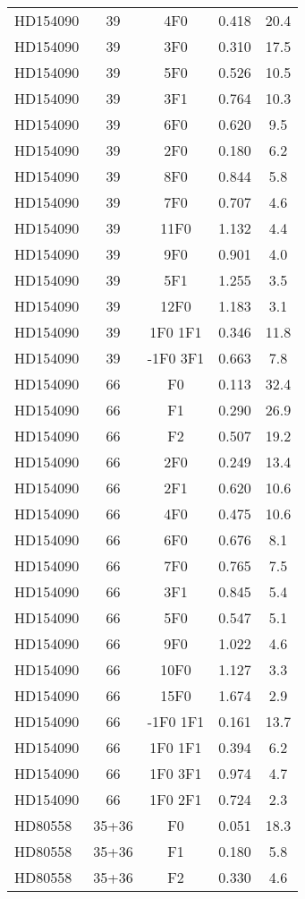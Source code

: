 \begin{table*}
\begin{tabular}{l c c c c}
HD154090 & 39 & 4F0 & 0.418 & 20.4\\ 
HD154090 & 39 & 3F0 & 0.310 & 17.5\\ 
HD154090 & 39 & 5F0 & 0.526 & 10.5\\ 
HD154090 & 39 & 3F1 & 0.764 & 10.3\\ 
HD154090 & 39 & 6F0 & 0.620 & 9.5\\ 
HD154090 & 39 & 2F0 & 0.180 & 6.2\\ 
HD154090 & 39 & 8F0 & 0.844 & 5.8\\ 
HD154090 & 39 & 7F0 & 0.707 & 4.6\\ 
HD154090 & 39 & 11F0 & 1.132 & 4.4\\ 
HD154090 & 39 & 9F0 & 0.901 & 4.0\\ 
HD154090 & 39 & 5F1 & 1.255 & 3.5\\ 
HD154090 & 39 & 12F0 & 1.183 & 3.1\\ 
HD154090 & 39 & 1F0 1F1 & 0.346 & 11.8\\ 
HD154090 & 39 & -1F0 3F1 & 0.663 & 7.8\\ 
\hline
HD154090 & 66 & F0 & 0.113 & 32.4\\ 
HD154090 & 66 & F1 & 0.290 & 26.9\\ 
HD154090 & 66 & F2 & 0.507 & 19.2\\ 
HD154090 & 66 & 2F0 & 0.249 & 13.4\\ 
HD154090 & 66 & 2F1 & 0.620 & 10.6\\ 
HD154090 & 66 & 4F0 & 0.475 & 10.6\\ 
HD154090 & 66 & 6F0 & 0.676 & 8.1\\ 
HD154090 & 66 & 7F0 & 0.765 & 7.5\\ 
HD154090 & 66 & 3F1 & 0.845 & 5.4\\ 
HD154090 & 66 & 5F0 & 0.547 & 5.1\\ 
HD154090 & 66 & 9F0 & 1.022 & 4.6\\ 
HD154090 & 66 & 10F0 & 1.127 & 3.3\\ 
HD154090 & 66 & 15F0 & 1.674 & 2.9\\ 
HD154090 & 66 & -1F0 1F1 & 0.161 & 13.7\\ 
HD154090 & 66 & 1F0 1F1 & 0.394 & 6.2\\ 
HD154090 & 66 & 1F0 3F1 & 0.974 & 4.7\\ 
HD154090 & 66 & 1F0 2F1 & 0.724 & 2.3\\ 
\hline
HD80558 & 35+36 & F0 & 0.051 & 18.3\\ 
HD80558 & 35+36 & F1 & 0.180 & 5.8\\ 
HD80558 & 35+36 & F2 & 0.330 & 4.6\\ 

\end{tabular}
\end{table*}
